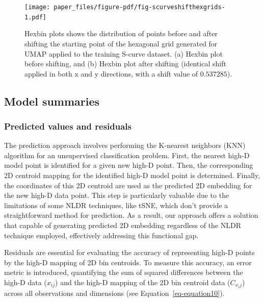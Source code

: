\documentclass[
  12pt]{article}
\begin{document}
\begin{figure}[H]

{\centering \texttt{[image: paper\_files/figure-pdf/fig-scurveshifthexgrids-1.pdf]}

}

\caption{\label{fig-scurveshifthexgrids}Hexbin plots shows the
distribution of points before and after shifting the starting point of
the hexagonal grid generated for UMAP applied to the training S-curve
dataset. (a) Hexbin plot before shifting, and (b) Hexbin plot after
shifting (identical shift applied in both x and y directions, with a
shift value of \(0.537285\)).}

\end{figure}

\hypertarget{sec-summary}{%
\subsection{Model summaries}\label{sec-summary}}

\hypertarget{predicted-values-and-residuals}{%
\subsubsection{Predicted values and
residuals}\label{predicted-values-and-residuals}}

The prediction approach involves performing the K-nearest neighbors
(KNN) algorithm for an unsupervised classification problem. First, the
nearest high-D model point is identified for a given new high-D point.
Then, the corresponding 2D centroid mapping for the identified high-D
model point is determined. Finally, the coordinates of this 2D centroid
are used as the predicted 2D embedding for the new high-D data point.
This step is particularly valuable due to the limitations of some NLDR
techniques, like tSNE, which don't provide a straightforward method for
prediction. As a result, our approach offers a solution that capable of
generating predicted 2D embedding regardless of the NLDR technique
employed, effectively addressing this functional gap.

Residuals are essential for evaluating the accuracy of representing
high-D points by the high-D mapping of 2D bin centroids. To measure this
accuracy, an error metric is introduced, quantifying the sum of squared
differences between the high-D data (\(x_{ij}\)) and the high-D mapping
of the 2D bin centroid data (\(C_{x_ij}\)) across all observations and
dimensions (see Equation~\ref{eq-equation10}).
\end{document}
